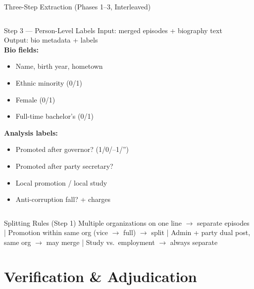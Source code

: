 \documentclass[aspectratio=169, 10pt]{beamer}
\begin{document}
\begin{frame}[shrink=18]{Three-Step Extraction (Phases 1--3, Interleaved)}
\begin{columns}[T,onlytextwidth]
    \begin{block}{Step 3 — Person-Level Labels}
      \small
      Input: merged episodes + biography text\\[4pt]
      Output: bio metadata + labels\\[4pt]
      \textbf{Bio fields:}
      \begin{itemize}\scriptsize
        \item Name, birth year, hometown
        \item Ethnic minority (0/1)
        \item Female (0/1)
        \item Full-time bachelor's (0/1)
      \end{itemize}
      \textbf{Analysis labels:}
      \begin{itemize}\scriptsize
        \item Promoted after governor? (1/0/--1/'')
        \item Promoted after party secretary?
        \item Local promotion / local study
        \item Anti-corruption fall? + charges
      \end{itemize}
    \end{block}
  \end{columns}

  \begin{alertblock}{Splitting Rules (Step 1)}
    \scriptsize
    Multiple organizations on one line $\to$ separate episodes \quad|\quad
    Promotion within same org (vice $\to$ full) $\to$ split \quad|\quad
    Admin + party dual post, same org $\to$ may merge \quad|\quad
    Study vs.\ employment $\to$ always separate
  \end{alertblock}
\end{frame}

\section{Verification \& Adjudication}
\end{document}
